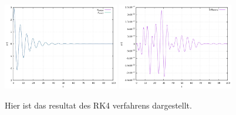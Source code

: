 \documentclass[ngerman]{scrartcl}
\begin{document}
\begin{figure}[htbp]
	\centering
	\includegraphics[width=0.45\textwidth]{ruku}
	\includegraphics[width=0.45\textwidth]{ruku_fehler}
	\caption[$f{ext}$]{Hier ist das resultat des RK4 verfahrens dargestellt.}
	\label{fig:euler}
\end{figure}
\end{document}
